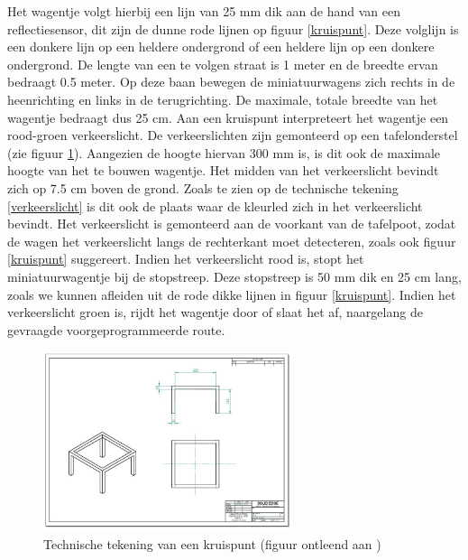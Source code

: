 \documentclass[a4paper,kulak]{kulakarticle}
\begin{document}
\begin{appendices}
Het wagentje volgt hierbij een lijn van 25 mm dik aan de hand van een reflectiesensor, dit zijn de dunne rode lijnen op figuur \ref{kruispunt}. Deze volglijn is een donkere lijn op een heldere ondergrond of een heldere lijn op een donkere ondergrond. De lengte van een te volgen straat is 1 meter en de breedte ervan bedraagt 0.5 meter. Op deze baan bewegen de miniatuurwagens zich rechts in de heenrichting en links in de terugrichting. De maximale, totale breedte van het wagentje bedraagt dus 25 cm. Aan een kruispunt interpreteert het wagentje een rood-groen verkeerslicht. De verkeerslichten zijn gemonteerd op een tafelonderstel (zie figuur \ref{techtekkruispunt}). Aangezien de hoogte hiervan 300 mm is, is dit ook de maximale hoogte van het te bouwen wagentje. Het midden van het verkeerslicht bevindt zich op 7.5 cm boven de grond. Zoals te zien op de technische tekening \ref{verkeerslicht} is dit ook de plaats waar de kleurled zich in het verkeerslicht bevindt. Het verkeerslicht is gemonteerd aan de voorkant van de tafelpoot, zodat de wagen het verkeerslicht langs de rechterkant moet detecteren, zoals ook figuur \ref{kruispunt} suggereert.  Indien het verkeerslicht rood is, stopt het miniatuurwagentje bij de stopstreep. Deze stopstreep is 50 mm dik en 25 cm lang, zoals we kunnen afleiden uit de rode dikke lijnen in figuur \ref{kruispunt}. Indien het verkeerslicht groen is, rijdt het wagentje door of slaat het af, naargelang de gevraagde voorgeprogrammeerde route.

\begin{figure}[h]
	\centering
	\includegraphics[width=0.65\textwidth]{tafelstel.png}
	\caption{Technische tekening van een kruispunt (figuur ontleend aan \cite{teamopdracht})}
	\label{techtekkruispunt}
\end{figure}


\end{appendices}
\end{document}
